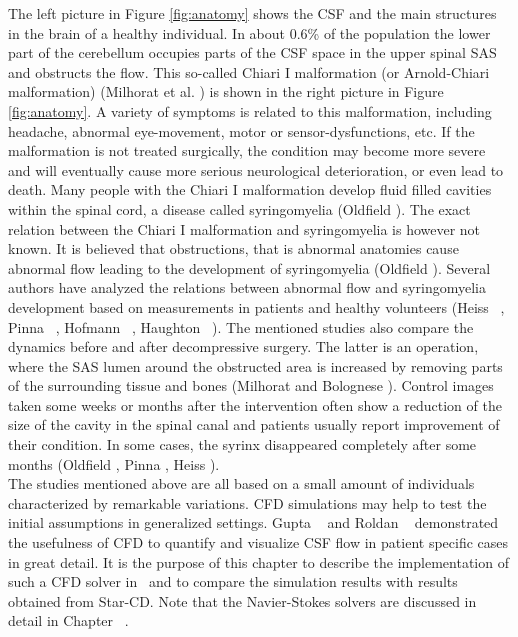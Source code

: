The left picture in Figure \ref{fig:anatomy} shows the CSF and the main structures in the brain of a healthy individual. In about 0.6\% of the population the lower part of the cerebellum occupies parts of the CSF space in the upper spinal SAS and obstructs the flow. This so-called Chiari I malformation  (or Arnold-Chiari malformation) (Milhorat et al. \cite{Milhorat1999}) is shown in the right picture in Figure \ref{fig:anatomy}. A variety of symptoms is related to this malformation, including headache, abnormal eye-movement, motor or sensor-dysfunctions, etc. If the malformation is not treated surgically, the condition may become more severe and will eventually cause more serious neurological deterioration, or even lead to death. Many people with the Chiari I malformation develop fluid filled cavities within the spinal cord,  a disease called syringomyelia (Oldfield \cite{Oldfield1994}). The exact relation between the Chiari I malformation and syringomyelia is however not known. It is believed that obstructions, that is abnormal anatomies cause abnormal flow leading to the development of syringomyelia (Oldfield \cite{Oldfield1994}). Several authors have analyzed the relations between abnormal flow and syringomyelia development based on measurements in patients and healthy volunteers  (Heiss ~\cite{Heiss1999}, Pinna ~\cite{Pinna2000}, Hofmann ~\cite{Hofmann2000}, Haughton ~\cite{Haughton2003}). The mentioned studies also compare the dynamics before and after decompressive surgery. The latter is an operation, where the SAS lumen around the obstructed area is increased by removing parts of the surrounding tissue and bones (Milhorat and Bolognese \cite{Milhorat2003}). Control images taken some weeks or months after the intervention often show a reduction of the size of the cavity in the spinal canal and patients usually report improvement of their condition. In some cases, the syrinx disappeared completely after some months (Oldfield \cite{1994}, Pinna \cite{Pinna2000}, Heiss \cite{Heiss1999}).\\

The studies mentioned above are all based on a small amount of individuals characterized by remarkable variations. CFD simulations may help to test the initial assumptions in generalized settings. Gupta ~\cite{Gupta2009} and Roldan ~\cite{Roldan2008} demonstrated the usefulness of CFD to quantify and visualize CSF flow in patient specific cases in great detail. It is the purpose of this chapter to describe the implementation of such a CFD solver in \fenics\ and to compare the simulation results with results obtained from Star-CD. Note that the Navier-Stokes solvers are discussed in detail in Chapter ~\cite{NS-bench}.\\

